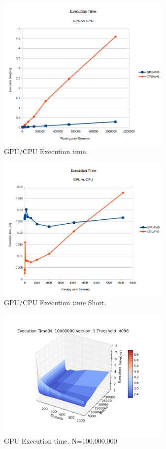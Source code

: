 \documentclass[conference]{IEEEtran}
\begin{document}
\begin{figure}[!t]
  \centering
  \includegraphics[width=8.5cm]{execution_time.png}      
  \caption{GPU/CPU Execution time.}
  \label{fig:execute}
\end{figure}

\begin{figure}[!t]
  \centering
  \includegraphics[width=8.5cm]{execution_time_short.png}      
  \caption{GPU/CPU Execution time Short.}
  \label{fig:executeshort}
\end{figure}

\begin{figure}[!t]
  \centering
  \includegraphics[width=8.5cm]{figure_10.png}      
  \caption{GPU Execution time. N=100,000,000}
  \label{fig:}
\end{figure}
\end{document}
